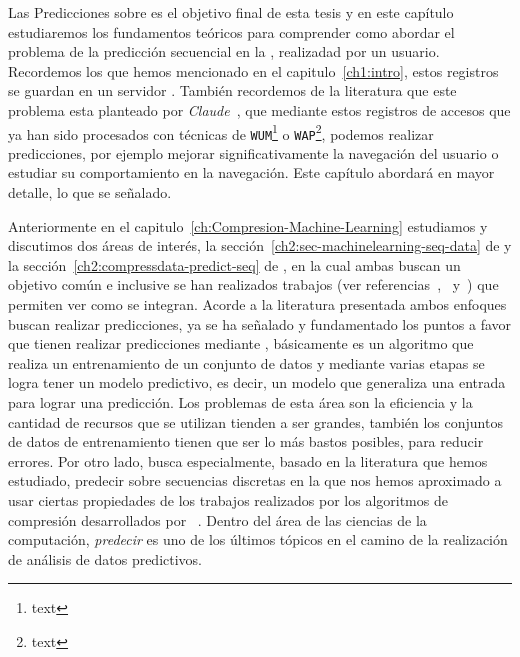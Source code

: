 


Las Predicciones sobre \webasccesslog es el objetivo final de esta tesis y en este capítulo estudiaremos los fundamentos teóricos para comprender como abordar el problema de la predicción secuencial en la \web, realizadad por un usuario. Recordemos los \webasccesslog que hemos mencionado en el capitulo~\ref{ch1:intro}, estos registros se guardan en un servidor \web. También recordemos de la literatura que este problema esta planteado por \emph{Claude}~\etal\cite{Claude2014}, que mediante estos registros de accesos que ya han sido procesados con técnicas de \texttt{WUM}\footnote{text} o \texttt{WAP}\footnote{text}, podemos realizar predicciones, por ejemplo mejorar significativamente la navegación del usuario o estudiar su comportamiento en la navegación. Este capítulo abordará en mayor detalle, lo que se señalado.
\newline

Anteriormente en el capitulo~\ref{ch:Compresion-Machine-Learning} estudiamos y discutimos dos áreas de interés, la sección~\ref{ch2:sec-machinelearning-seq-data} de \machinelearning y la sección~\ref{ch2:compressdata-predict-seq} de \losslessdatacompression, en la cual ambas buscan un objetivo común e inclusive se han realizados trabajos (ver referencias~\cite{Sculley2006},~\cite{Li2005} y~\cite{Begleiter2004}) que permiten ver como se integran. Acorde a la literatura presentada ambos enfoques buscan realizar predicciones, ya se ha señalado y fundamentado los puntos a favor que tienen realizar predicciones mediante \machinelearning, básicamente es un algoritmo que realiza un entrenamiento de un conjunto de datos y mediante varias etapas se logra tener un modelo predictivo, es decir, un modelo que generaliza una entrada para lograr una predicción. Los problemas de esta área son la eficiencia y la cantidad de recursos que se utilizan tienden a ser grandes, también los conjuntos de datos de entrenamiento tienen que ser lo más bastos posibles, para reducir errores. Por otro lado, \losslessdatacompression busca especialmente, basado en la literatura que hemos estudiado, predecir sobre secuencias discretas en la que nos hemos aproximado a usar ciertas propiedades de los trabajos realizados por los algoritmos de compresión desarrollados por \lempelziv~\cite{ZivLempel1978}. Dentro del área de las ciencias de la computación, \emph{predecir} es uno de los últimos tópicos en el camino de la realización de análisis de datos predictivos.

